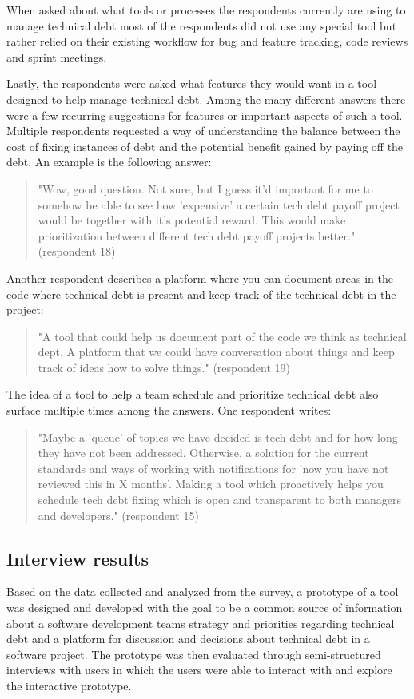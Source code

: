 When asked about what tools or processes the respondents currently are using to manage technical debt most of the respondents did not use any special tool but rather relied on their existing workflow for bug and feature tracking, code reviews and sprint meetings.

Lastly, the respondents were asked what features they would want in a tool designed to help manage technical debt.
Among the many different answers there were a few recurring suggestions for features or important aspects of such a tool.
Multiple respondents requested a way of understanding the balance between the cost of fixing instances of debt and the potential benefit gained by paying off the debt. An example is the following answer:
\begin{quote}
  "Wow, good question. Not sure, but I guess it'd important for me to somehow be able to see how 'expensive' a certain tech debt payoff project would be together with it's potential reward. This would make prioritization between different tech debt payoff projects better." (respondent 18)
\end{quote}
Another respondent describes a platform where you can document areas in the code where technical debt is present and keep track of the technical debt in the project:
\begin{quote}
  "A tool that could help us document part of the code we think as technical dept. A platform that we could have conversation about things and keep track of ideas how to solve things." (respondent 19)
\end{quote}
The idea of a tool to help a team schedule and prioritize technical debt also surface multiple times among the answers. One respondent writes:
\begin{quote}
  "Maybe a 'queue' of topics we have decided is tech debt and for how long they have not been addressed. Otherwise, a solution for the current standards and ways of working with notifications for 'now you have not reviewed this in X months'. Making a tool which proactively helps you schedule tech debt fixing which is open and transparent to both managers and developers." (respondent 15)
\end{quote} 

\subsection{Interview results}
Based on the data collected and analyzed from the survey, a prototype of a tool was designed and developed with the goal to be a common source of information about a software development teams strategy and priorities regarding technical debt and a platform for discussion and decisions about technical debt in a software project.
The prototype was then evaluated through semi-structured interviews with users in which the users were able to interact with and explore the interactive prototype.

